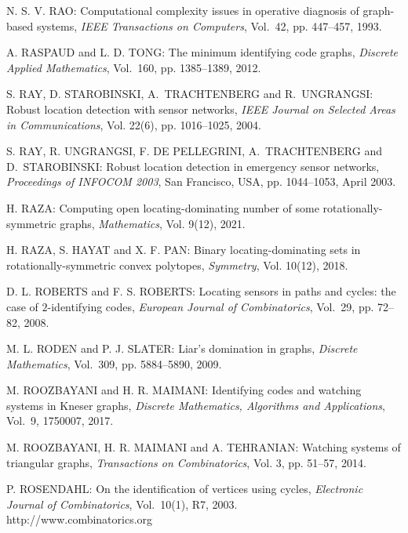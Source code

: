 \begin{thebibliography}{999}
N. S. V. RAO: Computational complexity issues in operative diagnosis of graph-based systems, {\it IEEE Transactions on Computers}, Vol.~42, pp. 447--457, 1993.

A. RASPAUD and L. D. TONG: The minimum identifying code graphs, {\it Discrete Applied Mathematics}, Vol.~160, pp. 1385--1389, 2012.

S. RAY, D. STAROBINSKI, A.~TRACHTENBERG and R.~UNGRANGSI: Robust location detection with sensor networks, {\it IEEE Journal on Selected Areas in Communications}, Vol. 22(6), pp. 1016--1025, 2004.

S. RAY, R. UNGRANGSI, F. DE PELLEGRINI, A.~TRACHTENBERG and D.~STAROBINSKI: Robust location detection in emergency sensor networks, {\it Proceedings of INFOCOM 2003}, San Francisco, USA, pp. 1044--1053, April 2003.

H. RAZA: Computing open locating-dominating number of some rotationally-symmetric graphs, {\it Mathematics},  Vol. 9(12), 2021.

H. RAZA, S. HAYAT and X. F. PAN: Binary locating-dominating sets in rotationally-symmetric convex polytopes, {\it Symmetry},  Vol. 10(12), 2018.

D. L. ROBERTS and F. S. ROBERTS: Locating sensors in paths and cycles: the case of $2$-identifying codes, {\it European Journal of Combinatorics}, Vol.~29, pp. 72--82, 2008.

M. L. RODEN and P. J. SLATER: Liar's domination in graphs, {\it Discrete Mathematics}, Vol.~309, pp. 5884--5890, 2009.

M. ROOZBAYANI and H. R. MAIMANI: Identifying codes and watching systems in Kneser graphs, {\it Discrete Mathematics, Algorithms and Applications}, Vol.~9, 1750007, 2017.

M. ROOZBAYANI, H. R. MAIMANI and A. TEHRANIAN: Watching systems of triangular graphs, {\it Transactions on Combinatorics}, Vol. 3, pp. 51--57, 2014.

P. ROSENDAHL: On the identification of vertices using cycles, {\it Electronic Journal of Combinatorics}, Vol.~10(1), R7, 2003.\\
http://www.combinatorics.org


\end{thebibliography}
